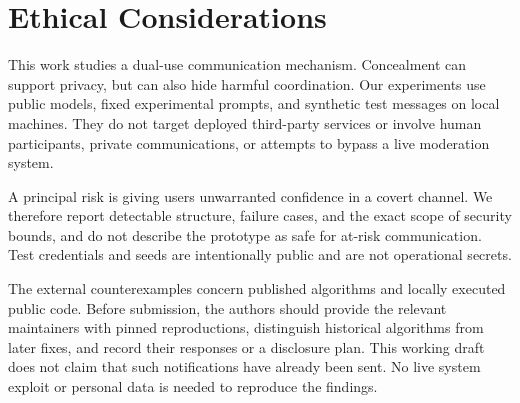 \section{Ethical Considerations}
\label{sec:ethical-considerations}

This work studies a dual-use communication mechanism. Concealment can support
privacy, but can also hide harmful coordination. Our experiments use public
models, fixed experimental prompts, and synthetic test messages on local machines.
They do not target deployed third-party services or involve human participants,
private communications, or attempts to bypass a live moderation system.

A principal risk is giving users unwarranted confidence in a covert channel.
We therefore report detectable structure, failure cases, and the exact scope
of security bounds, and do not describe the prototype as safe for at-risk
communication. Test credentials and seeds are intentionally public and are
not operational secrets.

The external counterexamples concern published algorithms and locally executed
public code. Before submission, the authors should provide the relevant
maintainers with pinned reproductions, distinguish historical algorithms from
later fixes, and record their responses or a disclosure plan. This working
draft does not claim that such notifications have already been sent. No live
system exploit or personal data is needed to reproduce the findings.
